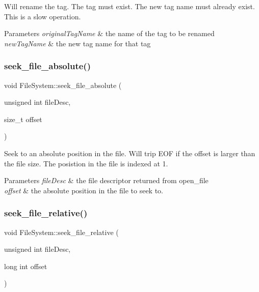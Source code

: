 Will rename the tag. The tag must exist. The new tag name must already exist. This is a slow operation. 
\begin{DoxyParams}{Parameters}
{\em original\+Tag\+Name} & the name of the tag to be renamed \\
\hline
{\em new\+Tag\+Name} & the new tag name for that tag \\
\hline
\end{DoxyParams}
\mbox{\label{class_file_system_af2d28b0d03e0595b686be6bc0e3e22b5}} 
\subsubsection{\texorpdfstring{seek\+\_\+file\+\_\+absolute()}{seek\_file\_absolute()}}
{\footnotesize\ttfamily void File\+System\+::seek\+\_\+file\+\_\+absolute (\begin{DoxyParamCaption}\item[{unsigned int}]{file\+Desc,  }\item[{size\+\_\+t}]{offset }\end{DoxyParamCaption})}

Seek to an absolute position in the file. Will trip E\+OF if the offset is larger than the file size. The posistion in the file is indexed at 1. 
\begin{DoxyParams}{Parameters}
{\em file\+Desc} & the file descriptor returned from open\+\_\+file \\
\hline
{\em offset} & the absolute position in the file to seek to. \\
\hline
\end{DoxyParams}
\mbox{\label{class_file_system_aee77ad983da8db9fe2de0c13b91fe977}} 
\subsubsection{\texorpdfstring{seek\+\_\+file\+\_\+relative()}{seek\_file\_relative()}}
{\footnotesize\ttfamily void File\+System\+::seek\+\_\+file\+\_\+relative (\begin{DoxyParamCaption}\item[{unsigned int}]{file\+Desc,  }\item[{long int}]{offset }\end{DoxyParamCaption})}

